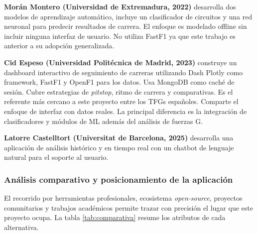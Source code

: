 \documentclass[12pt,a4paper,twoside,openright]{book}
\begin{document}
\noindent \textbf{Morán Montero (Universidad de Extremadura, 2022)} \cite{moranextremadura2022} desarrolla dos modelos de aprendizaje automático, incluye un clasificador de circuitos y una red neuronal para predecir resultados de carrera. El enfoque es modelado offline sin incluir ninguna interfaz de usuario.
No utiliza FastF1 ya que este trabajo es anterior a su adopción generalizada.

\noindent \textbf{Cid Espeso (Universidad Politécnica de Madrid, 2023)} \cite{cidespeso2023} construye un dashboard interactivo de seguimiento de carreras utilizando Dash Plotly como framework, FastF1 y OpenF1 para los datos.
Usa MongoDB como caché de sesión. Cubre estrategias de \textit{pitstop}, ritmo de carrera y comparativas. Es el referente más cercano a este proyecto entre los TFGs españoles. Comparte el enfoque de interfaz con datos reales. La principal diferencia es la integración
de clasificadores y módulos de ML además del análisis de fuerzas G.

\noindent \textbf{Latorre Castelltort (Universitat de Barcelona, 2025)} \cite{latorreub2025} desarrolla una aplicación de análisis histórico y en tiempo real con un chatbot de lenguaje natural para el soporte al usuario.

\subsubsection{Análisis comparativo y posicionamiento de la aplicación}
\noindent El recorrido por herramientas profesionales, ecosistema \textit{open-source}, proyectos comunitarios y trabajos académicos permite trazar con precisión el lugar que este proyecto ocupa. La tabla \ref{tab:comparativa} resume los atributos de cada alternativa.
\end{document}
